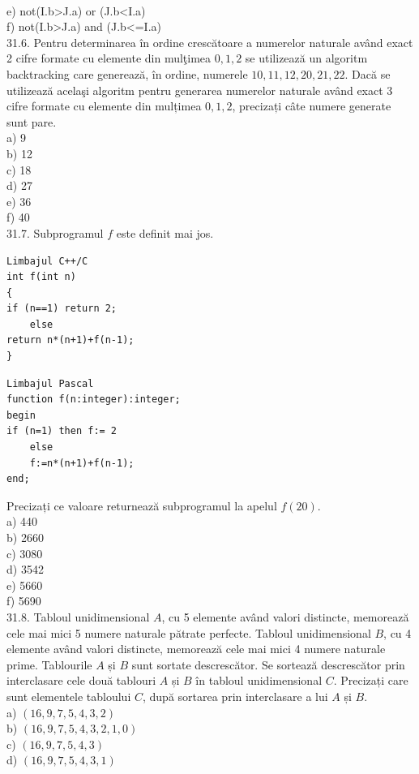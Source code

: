 \begin{itemize}
\begin{enumerate}
\\
e) not(I.b>J.a) or (J.b<I.a)
\\
f) not(I.b>J.a) and (J.b<=I.a)
\\
31.6. Pentru determinarea în ordine crescătoare a numerelor naturale având exact 2 cifre formate cu elemente din mulţimea ${0,1,2}$ se utilizează un algoritm backtracking care generează, în ordine, numerele $10,11,12,20,21,22$. Dacă se utilizează acelaşi algoritm pentru generarea numerelor naturale având exact 3 cifre formate cu elemente din mulțimea ${0,1,2}$, precizați câte numere generate sunt pare.
\\
a) 9
\\
b) 12
\\
c) 18
\\
d) 27
\\
e) 36
\\
f) 40
\\
31.7. Subprogramul $f$ este definit mai jos.
\begin{verbatim}
Limbajul C++/C
int f(int n)
{
if (n==1) return 2;
    else
return n*(n+1)+f(n-1);
}
\end{verbatim}
\begin{verbatim}
Limbajul Pascal
function f(n:integer):integer;
begin
if (n=1) then f:= 2
    else
    f:=n*(n+1)+f(n-1);
end;
\end{verbatim}
Precizați ce valoare returnează subprogramul la apelul $f(20)$.
\\
a) 440
\\
b) 2660
\\
c) 3080
\\
d) 3542
\\
e) 5660
\\
f) 5690
\\
31.8. Tabloul unidimensional $A$, cu 5 elemente având valori distincte, memorează cele mai mici 5 numere naturale pătrate perfecte. Tabloul unidimensional $B$, cu 4 elemente având valori distincte, memorează cele mai mici 4 numere naturale prime. Tablourile $A$ și $B$ sunt sortate descrescător. Se sortează descrescător prin interclasare cele două tablouri $A$ și $B$ în tabloul unidimensional $C$. Precizați care sunt elementele tabloului $C$, după sortarea prin interclasare a lui $A$ și $B$.
\\
a) $(16,9,7,5,4,3,2)$
\\
b) $(16,9,7,5,4,3,2,1,0)$
\\
c) $(16,9,7,5,4,3)$
\\
d) $(16,9,7,5,4,3,1)$
\\

\end{enumerate}
\end{itemize}
